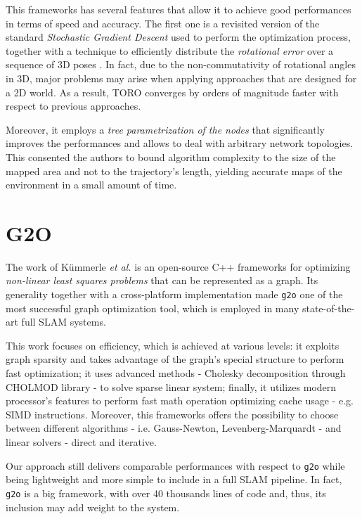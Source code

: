 This frameworks has several features that allow it to achieve good performances in terms of speed and accuracy. The first one is a revisited version of the standard \textit{Stochastic Gradient Descent} used to perform the optimization process, together with a technique to efficiently distribute the \textit{rotational error} over a sequence of 3D poses \cite{grisetti2007efficient}. In fact, due to the non-commutativity of rotational angles in 3D, major problems may arise when applying approaches that are designed for a 2D world. As a result, TORO converges by orders of magnitude faster with respect to previous approaches.

Moreover, it employs a \textit{tree parametrization of the nodes} \cite{grisetti2007tree} that significantly improves the performances and allows to deal with arbitrary network topologies. This consented the authors to bound algorithm complexity to the size of the mapped area and not to the trajectory's length, yielding accurate maps of the environment in a small amount of time.

\section{G2O}\label{sec:g2o}
The work of K\"ummerle \textit{et al.} \cite{kummerle2011g} is an open-source C++ frameworks for optimizing \textit{non-linear least squares problems} that can be represented as a graph. Its generality together with a cross-platform implementation made \texttt{g2o} one of the most successful graph optimization tool, which is employed in many state-of-the-art full SLAM systems. 

This work focuses on efficiency, which is achieved at various levels: it exploits graph sparsity and takes advantage of the graph's special structure to perform fast optimization; it uses advanced methods - Cholesky decomposition through CHOLMOD library - to solve sparse linear system; finally, it utilizes modern processor's features to perform fast math operation optimizing cache usage - e.g. SIMD instructions. Moreover, this frameworks offers the possibility to choose between different algorithms - i.e. Gauss-Newton, Levenberg-Marquardt - and linear solvers - direct and iterative.

Our approach still delivers comparable performances with respect to \texttt{g2o} while being lightweight and more simple to include in a full SLAM pipeline. In fact, \texttt{g2o} is a big framework, with over 40 thousands lines of code and, thus, its inclusion may add weight to the system.

